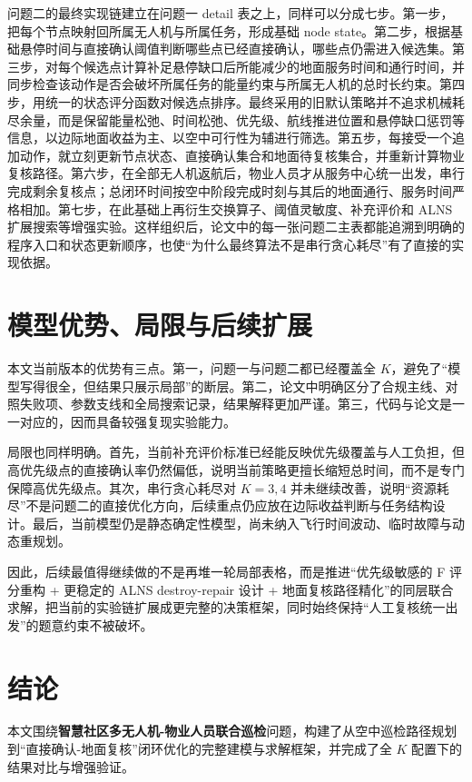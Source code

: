\documentclass[12pt]{article}
\begin{document}
问题二的最终实现链建立在问题一 detail 表之上，同样可以分成七步。第一步，把每个节点映射回所属无人机与所属任务，形成基础 node state。第二步，根据基础悬停时间与直接确认阈值判断哪些点已经直接确认，哪些点仍需进入候选集。第三步，对每个候选点计算补足悬停缺口后所能减少的地面服务时间和通行时间，并同步检查该动作是否会破坏所属任务的能量约束与所属无人机的总时长约束。第四步，用统一的状态评分函数对候选点排序。最终采用的旧默认策略并不追求机械耗尽余量，而是保留能量松弛、时间松弛、优先级、航线推进位置和悬停缺口惩罚等信息，以边际地面收益为主、以空中可行性为辅进行筛选。第五步，每接受一个追加动作，就立刻更新节点状态、直接确认集合和地面待复核集合，并重新计算物业复核路径。第六步，在全部无人机返航后，物业人员才从服务中心统一出发，串行完成剩余复核点；总闭环时间按空中阶段完成时刻与其后的地面通行、服务时间严格相加。第七步，在此基础上再衍生交换算子、阈值灵敏度、补充评价和 ALNS 扩展搜索等增强实验。这样组织后，论文中的每一张问题二主表都能追溯到明确的程序入口和状态更新顺序，也使“为什么最终算法不是串行贪心耗尽”有了直接的实现依据。

\section{模型优势、局限与后续扩展}
本文当前版本的优势有三点。第一，问题一与问题二都已经覆盖全 $K$，避免了“模型写得很全，但结果只展示局部”的断层。第二，论文中明确区分了合规主线、对照失败项、参数支线和全局搜索记录，结果解释更加严谨。第三，代码与论文是一一对应的，因而具备较强复现实验能力。

局限也同样明确。首先，当前补充评价标准已经能反映优先级覆盖与人工负担，但高优先级点的直接确认率仍然偏低，说明当前策略更擅长缩短总时间，而不是专门保障高优先级点。其次，串行贪心耗尽对 $K=3,4$ 并未继续改善，说明“资源耗尽”不是问题二的直接优化方向，后续重点仍应放在边际收益判断与任务结构设计。最后，当前模型仍是静态确定性模型，尚未纳入飞行时间波动、临时故障与动态重规划。

因此，后续最值得继续做的不是再堆一轮局部表格，而是推进“优先级敏感的 F 评分重构 + 更稳定的 ALNS destroy-repair 设计 + 地面复核路径精化”的同层联合求解，把当前的实验链扩展成更完整的决策框架，同时始终保持“人工复核统一出发”的题意约束不被破坏。

\section{结论}
本文围绕\textbf{智慧社区多无人机-物业人员联合巡检}问题，构建了从空中巡检路径规划到“直接确认-地面复核”闭环优化的完整建模与求解框架，并完成了全 $K$ 配置下的结果对比与增强验证。
\end{document}
